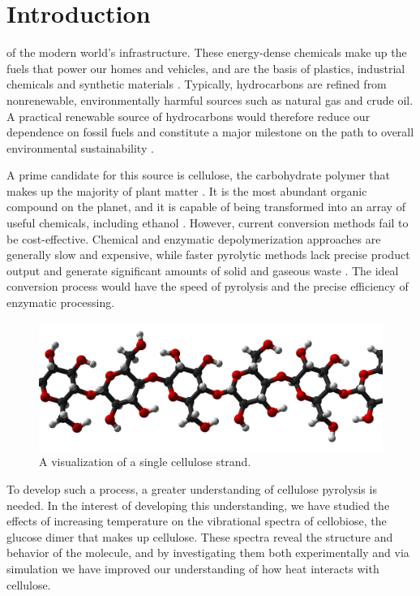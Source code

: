 \chapter{Introduction}
\label{introduction}

 of the modern world's infrastructure. These energy-dense chemicals make up the fuels that power our homes and vehicles, and are the basis of plastics, industrial chemicals and synthetic materials \cite{Refworks:27}. Typically, hydrocarbons are refined from nonrenewable, environmentally harmful sources such as natural gas and crude oil. A practical renewable source of hydrocarbons would therefore reduce our dependence on fossil fuels and constitute a major milestone on the path to overall environmental sustainability \cite{RefWorks:28}.

A prime candidate for this source is cellulose, the carbohydrate polymer that makes up the majority of plant matter \cite{RefWorks:29}. It is the most abundant organic compound on the planet, and it is capable of being transformed into an array of useful chemicals, including ethanol \cite{RefWorks:30}. However, current conversion methods fail to be cost-effective. Chemical and enzymatic depolymerization approaches are generally slow and expensive, while faster pyrolytic methods lack precise product output and generate significant amounts of solid and gaseous waste \cite{RefWorks:30}. The ideal conversion process would have the speed of pyrolysis and the precise efficiency of enzymatic processing.

\begin{figure}
	\centering
	\includegraphics[width=0.7\linewidth]{Cellulose-structure}
	\caption{A visualization of a single cellulose strand.}
	\label{fig:Cellulose-structure}
\end{figure}

To develop such a process, a greater understanding of cellulose pyrolysis is needed. In the interest of developing this understanding, we have studied the effects of increasing temperature on the vibrational spectra of cellobiose, the glucose dimer that makes up cellulose. These spectra reveal the structure and behavior of the molecule, and by investigating them both experimentally and via simulation we have improved our understanding of how heat interacts with cellulose.


